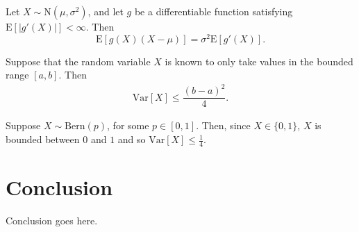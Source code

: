 \documentclass{mldsmsc}
\begin{document}
\begin{lemma}
    Let $X \sim \mathrm{N}(\mu, \sigma^2)$, and let $g$ be a differentiable 
    function satisfying $\mathrm{E}[|g'(X)|] < \infty$. Then
    \begin{equation}
        \mathrm{E}[g(X)(X-\mu)] = \sigma^2 \mathrm{E}[g'(X)].
        \nonumber
    \end{equation}
\end{lemma}

\begin{proposition}
    Suppose that the random variable $X$ is known to only take values in the 
    bounded range $[a, b]$. Then  
    \begin{align}
        \mathrm{Var}[X] \leq \dfrac{(b-a)^2}{4}.
        \nonumber
    \end{align}
\end{proposition}

\begin{example}
    Suppose $X \sim \mathrm{Bern} (p)$, for some $p \in [0,1]$. Then, 
    since $X \in \{0, 1\}$, $X$ is bounded between $0$ and $1$ and so
    $\mathrm{Var}[X] \leq \tfrac{1}{4}$.
\end{example}



\chapter{Conclusion}


Conclusion goes here. 





\clearpage
\renewcommand*{\thepage}{A\arabic{page}}

%
%




\end{document}

